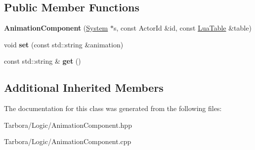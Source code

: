 \subsection*{Public Member Functions}
\begin{DoxyCompactItemize}
\item 
\mbox{\label{classTarbora_1_1AnimationComponent_a80c77d7fedaca33e0ae0898da08bcf2b}} 
{\bfseries Animation\+Component} (\hyperlink{classTarbora_1_1System}{System} $\ast$s, const Actor\+Id \&id, const \hyperlink{classTarbora_1_1LuaTable}{Lua\+Table} \&table)
\item 
\mbox{\label{classTarbora_1_1AnimationComponent_a82fbbb5ad1b752c8cba225796812351e}} 
void {\bfseries set} (const std\+::string \&animation)
\item 
\mbox{\label{classTarbora_1_1AnimationComponent_affc9c4991f3387ad6996e17b0bdc6970}} 
const std\+::string \& {\bfseries get} ()
\end{DoxyCompactItemize}
\subsection*{Additional Inherited Members}


The documentation for this class was generated from the following files\+:\begin{DoxyCompactItemize}
\item 
Tarbora/\+Logic/Animation\+Component.\+hpp\item 
Tarbora/\+Logic/Animation\+Component.\+cpp\end{DoxyCompactItemize}
